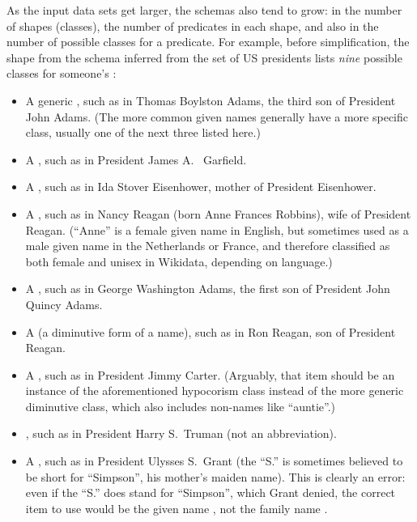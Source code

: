 As the input data sets get larger,
the schemas also tend to grow:
in the number of shapes (classes),
the number of predicates in each shape,
and also in the number of possible classes for a predicate.
For example, before simplification,
the  shape from the schema inferred from the set of US presidents
lists \emph{nine} possible classes for someone’s :
\begin{itemize}
\item A generic ,
  such as  in Thomas Boylston Adams, the third son of President John Adams.
  (The more common given names generally have a more specific class,
  usually one of the next three listed here.)
\item A ,
  such as  in President James A.~ Garfield.
\item A ,
  such as  in Ida Stover Eisenhower, mother of President Eisenhower.
\item A ,
  such as  in Nancy Reagan (born Anne Frances Robbins), wife of President Reagan.
  (“Anne” is a female given name in English,
  but sometimes used as a male given name in the Netherlands or France,
  and therefore classified as both female and unisex in Wikidata, depending on language.)
\item A ,
  such as  in George Washington Adams, the first son of President John Quincy Adams.
\item A  (a diminutive form of a name),
  such as  in Ron Reagan, son of President Reagan.
\item A ,
  such as  in President Jimmy Carter.
  (Arguably, that item should be an instance of the aforementioned hypocorism class
  instead of the more generic diminutive class, which also includes non-names like “auntie”.)
\item {},
  such as  in President Harry S.~Truman (not an abbreviation).
\item A ,
  such as  in President Ulysses S.~Grant
  (the “S.” is sometimes believed to be short for “Simpson”, his mother’s maiden name).
  This is clearly an error: even if the “S.” does stand for “Simpson”, which Grant denied,
  the correct item to use would be the given name , not the family name .
\end{itemize}

